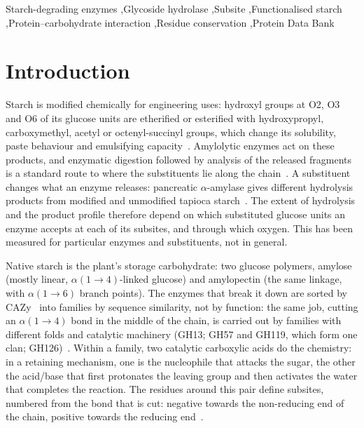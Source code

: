 \documentclass[preprint,12pt]{elsarticle}
\begin{document}
\begin{frontmatter}

\begin{keyword}
Starch-degrading enzymes \sep Glycoside hydrolase \sep Subsite \sep Functionalised starch
\sep Protein--carbohydrate interaction \sep Residue conservation \sep Protein Data Bank
\end{keyword}

\end{frontmatter}

\linenumbers
\doublespacing

\section{Introduction}

Starch is modified chemically for engineering uses: hydroxyl groups at O2, O3 and O6 of its
glucose units are etherified or esterified with hydroxypropyl, carboxymethyl, acetyl or
octenyl-succinyl groups, which change its solubility, paste behaviour and emulsifying
capacity~\citep{Masina2017,Chen2015,Altuna2018}. Amylolytic enzymes act on these products,
and enzymatic digestion followed by analysis of the released fragments is a standard route
to where the substituents lie along the chain~\citep{Richardson2003,Mischnick2010,Zhao2012}.
A substituent changes what an enzyme releases: pancreatic $\alpha$-amylase gives different
hydrolysis products from modified and unmodified tapioca starch~\citep{Conway1976}. The
extent of hydrolysis and the product profile therefore depend on which substituted glucose
units an enzyme accepts at each of its subsites, and through which oxygen. This has been
measured for particular enzymes and substituents, not in general.

Native starch is the plant's storage carbohydrate: two glucose polymers, amylose (mostly
linear, $\alpha(1\!\to\!4)$-linked glucose) and amylopectin (the same linkage, with
$\alpha(1\!\to\!6)$ branch points). The enzymes that break it down are sorted by CAZy~\citep{Drula2022}
into families by sequence similarity, not by function: the same job, cutting an
$\alpha(1\!\to\!4)$ bond in the middle of the chain, is carried out by families with
different folds and catalytic machinery (GH13; GH57 and GH119, which form one clan;
GH126)~\citep{Janecek2014}. Within a family, two catalytic carboxylic acids do the
chemistry: in a retaining mechanism, one is the nucleophile that attacks the sugar, the
other the acid/base that first protonates the leaving group and then activates the water
that completes the reaction. The residues around this pair define subsites, numbered from
the bond that is cut: negative towards the non-reducing end of the chain, positive towards
the reducing end~\citep{Davies1997}.
\end{document}

